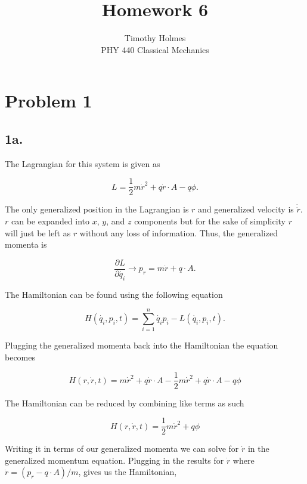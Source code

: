 \documentclass[12pt]{article}
\begin{document}
 
 
\title{Homework 6}
\author{Timothy Holmes\\ %
PHY 440 Classical Mechanics}

\maketitle

\section*{Problem 1}

\subsection*{1a.}

The Lagrangian for this system is given as 

$$
L = \frac{1}{2}m\dot{r}^2 + q\dot{r} \cdot A - q\phi.
$$

The only generalized position in the Lagrangian is $r$ and generalized velocity is $\dot{\dot{r}}$. $r$ can be expanded into $x$, $y$, and $z$ components but for the sake of simplicity $r$ will just be left as $r$ without any loss of information. Thus, the generalized momenta is 

$$
\frac{\partial L}{\partial \dot{q_{i}}} \rightarrow p_{r} = m\dot{r} + q \cdot A.
$$

The Hamiltonian can be found using the following equation

$$
H(\dot{q_{i}}, p_i, t) = \sum_{i = 1}^{n} \dot{q_{i}}p_i - L(\dot{q_{i}}, p_i, t).
$$

Plugging the generalized momenta back into the Hamiltonian the equation becomes 

$$
H(r, \dot{r}, t) = m\dot{r}^{2} + q\dot{r} \cdot A - \frac{1}{2}m\dot{r}^2 + q\dot{r} \cdot A - q\phi
$$

The Hamiltonian can be reduced by combining like terms as such

$$
H(r, \dot{r}, t) = \frac{1}{2}m\dot{r}^2 + q\phi
$$

Writing it in terms of our generalized momenta we can solve for $\dot{r}$ in the generalized momentum equation. Plugging in the results for $\dot{r}$ where $\dot{r} = (p_{r} - q \cdot A)/m$, gives us the Hamiltonian,
\end{document}
